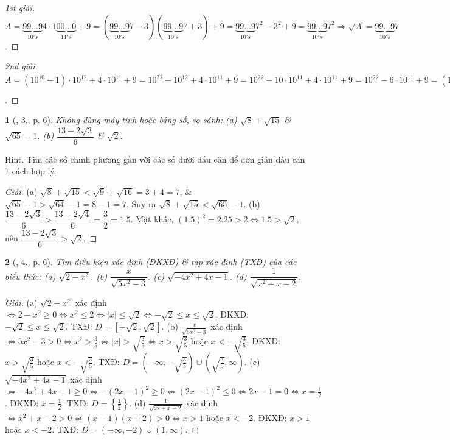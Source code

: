 \documentclass{article}
\newtheorem{baitoan}{}%
\begin{document}
\begin{proof}[1st giải]
	$A = \underbrace{99\ldots9}_{10's}4\cdot1\underbrace{00\ldots0}_{11's} + 9 = (\underbrace{99\ldots9}_{10's}7 - 3)(\underbrace{99\ldots9}_{10's}7 + 3) + 9 = \underbrace{99\ldots9}_{10's}7^2 - 3^2 + 9 = \underbrace{99\ldots9}_{10's}7^2\Rightarrow\sqrt{A} = \underbrace{99\ldots9}_{10's}7$.
\end{proof}

\begin{proof}[2nd giải]
	$A = (10^{10} - 1)\cdot10^{12} + 4\cdot10^{11} + 9 = 10^{22} - 10^{12} + 4\cdot10^{11} + 9 = 10^{22} - 10\cdot10^{11} + 4\cdot10^{11} + 9 = 10^{22} - 6\cdot10^{11} + 9 = (10^{11} - 3)^2\Rightarrow\sqrt{A} = 10^{11} - 3 = \underbrace{99\ldots9}_{10's}7$.
\end{proof}

\begin{baitoan}[\cite{Tuyen_Toan_9_old}, 3., p. 6]
	Không dùng máy tính hoặc bảng số, so sánh: (a) $\sqrt{8} + \sqrt{15}$ \& $\sqrt{65} - 1$. (b) $\dfrac{13 - 2\sqrt{3}}{6}$ \& $\sqrt{2}$.
\end{baitoan}
\noindent\textsf{Hint.} Tìm các số chính phương gần với các số dưới dấu căn để đơn giản dấu căn 1 cách hợp lý. 

\begin{proof}[Giải]
	(a) $\sqrt{8} + \sqrt{15} < \sqrt{9} + \sqrt{16} = 3 + 4 = 7$, \& $\sqrt{65} - 1 > \sqrt{64} - 1 = 8 - 1 = 7$. Suy ra $\sqrt{8} + \sqrt{15} < \sqrt{65} - 1$. (b) $\dfrac{13 - 2\sqrt{3}}{6} > \dfrac{13 - 2\sqrt{4}}{6} = \dfrac{3}{2} = 1.5$. Mặt khác, $(1.5)^2 = 2.25 > 2\Leftrightarrow 1.5 > \sqrt{2}$, nên $\dfrac{13 - 2\sqrt{3}}{6} > \sqrt{2}$.
\end{proof}

\begin{baitoan}[\cite{Tuyen_Toan_9_old}, 4., p. 6]
	Tìm điều kiện xác định (ĐKXĐ) \& tập xác định (TXĐ) của các biểu thức: (a) $\sqrt{2 - x^2}$. (b) $\dfrac{x}{\sqrt{5x^2 - 3}}$. (c) $\sqrt{-4x^2 + 4x - 1}$. (d) $\dfrac{1}{\sqrt{x^2 + x - 2}}$.
\end{baitoan}

\begin{proof}[Giải]
	(a) $\sqrt{2 - x^2}$ xác định $\Leftrightarrow2 - x^2\ge0\Leftrightarrow x^2\le2\Leftrightarrow|x|\le\sqrt{2}\Leftrightarrow-\sqrt{2}\le x\le\sqrt{2}$. ĐKXĐ: $-\sqrt{2}\le x\le\sqrt{2}$. TXĐ: $D = [-\sqrt{2},\sqrt{2}]$. (b) $\frac{x}{\sqrt{5x^2 - 3}}$ xác định $\Leftrightarrow 5x^2 - 3 > 0\Leftrightarrow x^2 > \frac{3}{5}\Leftrightarrow|x| > \sqrt{\frac{3}{5}}\Leftrightarrow x > \sqrt{\frac{3}{5}}$ hoặc $x < -\sqrt{\frac{3}{5}}$. ĐKXĐ: $x > \sqrt{\frac{3}{5}}$ hoặc $x < -\sqrt{\frac{3}{5}}$. TXĐ: $D = \left(-\infty,-\sqrt{\frac{3}{5}}\right)\cup\left(\sqrt{\frac{3}{5}},\infty\right)$. (c) $\sqrt{-4x^2 + 4x - 1}$ xác định $\Leftrightarrow-4x^2 + 4x - 1\ge0\Leftrightarrow-(2x - 1)^2\ge0\Leftrightarrow(2x - 1)^2\le0\Leftrightarrow2x - 1 = 0\Leftrightarrow x = \frac{1}{2}$. ĐKXĐ: $x = \frac{1}{2}$. TXĐ: $D = \left\{\frac{1}{2}\right\}$. (d) $\frac{1}{\sqrt{x^2 + x - 2}}$ xác định $\Leftrightarrow x^2 + x - 2 > 0\Leftrightarrow(x - 1)(x + 2) > 0\Leftrightarrow x > 1$ hoặc $x < -2$. ĐKXĐ: $x > 1$ hoặc $x < -2$. TXĐ: $D = (-\infty,-2)\cup(1,\infty)$.
\end{proof}
\end{document}

